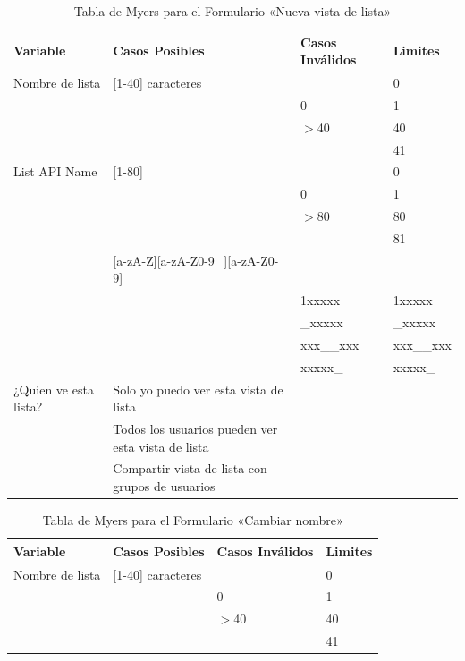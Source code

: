 \begin{table}[H]
\centering
\begin{tabular}{|p{3.0cm}|p{7.0cm}|p{3.0cm}|l|}
\hline
\footnotesize{\textbf{Variable}} & \footnotesize{\textbf{Casos Posibles}} & \footnotesize{\textbf{Casos Inválidos}} & \footnotesize{\textbf{Limites}} \\
\hline
\footnotesize{Nombre de lista} & \footnotesize{[1-40] caracteres} & & \footnotesize{0} \\
& & \footnotesize{0} & \footnotesize{1} \\
& & \footnotesize{$>$40} & \footnotesize{40} \\
& & & \footnotesize{41} \\
\hline
\footnotesize{List API Name} & \footnotesize{[1-80]} & & \footnotesize{0} \\
& & \footnotesize{0} & \footnotesize{1} \\
& & \footnotesize{$>$80} & \footnotesize{80} \\
& & & \footnotesize{81} \\
& \footnotesize{[a-zA-Z][a-zA-Z0-9\_][a-zA-Z0-9]} & & \\
& & \footnotesize{1xxxxx} & \footnotesize{1xxxxx} \\
& & \footnotesize{\_xxxxx} & \footnotesize{\_xxxxx} \\
& & \footnotesize{xxx\_\_xxx} & \footnotesize{xxx\_\_xxx} \\
& & \footnotesize{xxxxx\_} & \footnotesize{xxxxx\_} \\
\hline
\footnotesize{¿Quien ve esta lista?} & \footnotesize{Solo yo puedo ver esta vista de lista} & & \\
& \footnotesize{Todos los usuarios pueden ver esta vista de lista} & & \\
& \footnotesize{Compartir vista de lista con grupos de usuarios} & & \\
\hline
\end{tabular}
\caption{Tabla de Myers para el Formulario «Nueva vista de lista»}
\label{myers_07}
\end{table}

\begin{table}[H]
\centering
\begin{tabular}{|l|l|l|l|}
\hline
\footnotesize{\textbf{Variable}} & \footnotesize{\textbf{Casos Posibles}} & \footnotesize{\textbf{Casos Inválidos}} & \footnotesize{\textbf{Limites}} \\
\hline
\footnotesize{Nombre de lista} & \footnotesize{[1-40] caracteres} & & \footnotesize{0} \\
& & \footnotesize{0} & \footnotesize{1} \\
& & \footnotesize{$>$40} & \footnotesize{40} \\
& & & \footnotesize{41} \\
\hline
\end{tabular}
\caption{Tabla de Myers para el Formulario «Cambiar nombre»}
\label{myers_08}
\end{table}

